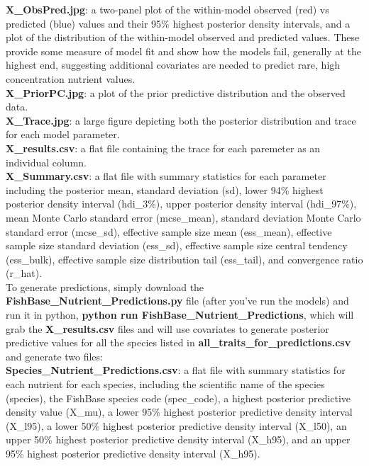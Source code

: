\documentclass{article}
\begin{document}
{\bf X\_ObsPred.jpg}:  a two-panel plot of the within-model observed (red) vs predicted (blue) values and their 95\% highest posterior density intervals, and a plot of the distribution of the within-model observed and predicted values. These provide some measure of model fit and show how the models fail, generally at the highest end, suggesting additional covariates are needed to predict rare, high concentration nutrient values.\\

{\bf X\_PriorPC.jpg}:  a plot of the prior predictive distribution and the observed data. \\

{\bf X\_Trace.jpg}:  a large figure depicting both the posterior distribution and trace for each model parameter. \\

{\bf X\_results.csv}:  a flat file containing the trace for each paremeter as an individual column.\\

{\bf X\_Summary.csv}:  a flat file with summary statistics for each parameter including the posterior mean, standard deviation (sd), lower 94\% highest posterior density interval (hdi\_3\%), upper posterior density interval (hdi\_97\%), mean Monte Carlo standard error (mcse\_mean), standard deviation Monte Carlo standard error (mcse\_sd), effective sample size mean (ess\_mean), effective sample size standard deviation (ess\_sd), effective sample size central tendency (ess\_bulk), effective sample size distribution tail (ess\_tail), and convergence ratio (r\_hat). \\


To generate predictions, simply download the {\bf FishBase\_Nutrient\_Predictions.py} file (after you've run the models) and run it in python, {\bf python run FishBase\_Nutrient\_Predictions}, which will grab the {\bf X\_results.csv} files and will use covariates to generate posterior predictive values for all the species listed in {\bf all\_traits\_for\_predictions.csv} and generate two files:\\

{\bf Species\_Nutrient\_Predictions.csv}:  a flat file with summary statistics for each nutrient for each species, including the scientific name of the species (species), the FishBase species code (spec\_code), a highest posterior predictive density value (X\_mu), a lower 95\% highest posterior predictive density interval (X\_l95), a lower 50\% highest posterior predictive density interval (X\_l50), an upper 50\% highest posterior predictive density interval (X\_h95), and an upper 95\% highest posterior predictive density interval (X\_h95).\\
\end{document}

